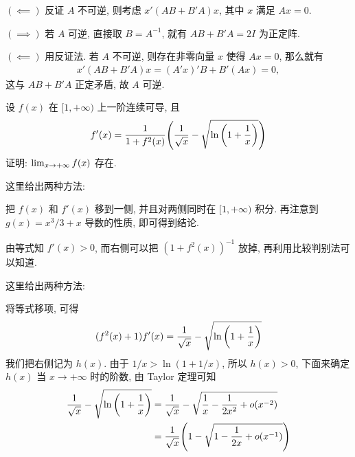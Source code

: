 \begin{exercise}[series=exer]
\begin{hint}
      $ (\impliedby) $ 反证 $ A $ 不可逆, 则考虑 $ x'(AB + B'A)x $, 其中 $ x $ 满足 $ Ax = 0 $.
  \end{hint}
  \begin{answer}
      $ (\implies) $ 若 $ A $ 可逆, 直接取 $ B = A^{-1} $, 就有 $ AB + B'A = 2I $ 为正定阵.

      $ (\impliedby) $ 用反证法. 若 $ A $ 不可逆, 则存在非零向量 $ x $ 使得 $ Ax = 0 $, 那么就有
      \begin{align*}
          x'(AB + B'A)x = (A'x)'B + B'(Ax) = 0,
      \end{align*}
      这与 $ AB + B'A $ 正定矛盾, 故 $ A $ 可逆.
  \end{answer}
  \item
  \item 设 $ f(x) $ 在 $ [1, +\infty) $ 上一阶连续可导, 且
  \begin{align*}
      f'(x) = \frac{1}{1 + f^{2}(x)}\qty(\frac{1}{\sqrt{x}} - \sqrt{\ln\qty(1 + \frac{1}{x})})
  \end{align*}
  证明: $ \lim_{x \to +\infty}f(x) $ 存在.
  \begin{hint}
      这里给出两种方法:
      \begin{method}
      \item 把 $ f(x) $ 和 $ f'(x) $ 移到一侧, 并且对两侧同时在 $ [1, +\infty) $ 积分. 再注意到 $ g(x) = x^{3}/3 + x $ 导数的性质, 即可得到结论.
      \item 由等式知 $ f'(x) > 0 $, 而右侧可以把 $ (1 + f^{2}(x))^{-1} $ 放掉, 再利用比较判别法可以知道.
      \end{method}
  \end{hint}
  \begin{answer}
      这里给出两种方法:
      \begin{method}
          \item\label{method:移项积分} 将等式移项, 可得
          \begin{align}\label{eq:f2x+1f'x}
              (f^{2}(x) + 1)f'(x) = \frac{1}{\sqrt{x}} - \sqrt{\ln\qty(1 + \frac{1}{x})}
          \end{align}
          我们把右侧记为 $ h(x) $. 由于 $ 1/x > \ln(1 + 1/x) $, 所以 $ h(x) > 0 $, 下面来确定 $ h(x) $ 当 $ x \to +\infty $ 时的阶数, 由 Taylor 定理可知
          \begin{align*}
              \frac{1}{\sqrt{x}} - \sqrt{\ln\qty(1 + \frac{1}{x})} & = \frac{1}{\sqrt{x}} - \sqrt{\frac{1}{x} - \frac{1}{2x^{2}} + o(x^{-2})} \\
              & = \frac{1}{\sqrt{x}}\qty(1 - \sqrt{1 - \frac{1}{2x} + o(x^{-1})})\\

\end{align*}
\end{method}
\end{answer}
\end{exercise}
